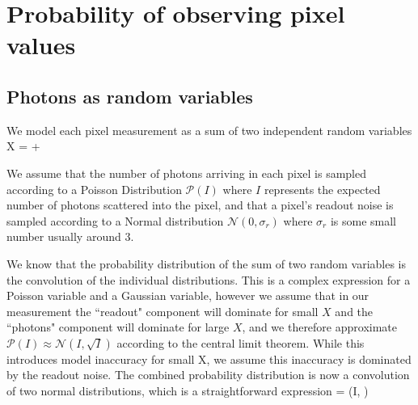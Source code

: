 \documentclass[dists.tex]{subfiles}
\begin{document}
\section{Probability of observing pixel values}

\subsection{Photons as random variables}
We model each pixel measurement as a sum of two independent random variables
\be
X =  + 
\ee

\noindent
We assume that the number of photons arriving in each pixel is sampled according to a Poisson Distribution $\mathcal{P}(I)$ where $I$ represents the expected number of photons scattered into the pixel, and that a pixel's readout noise is sampled according to a Normal distribution $\mathcal{N}(0, \sigma_r)$ where $\sigma_r$ is some small number usually around 3. 

\noindent We know that the probability distribution of the sum of two random variables is the convolution of the individual distributions. This is a complex expression for a Poisson variable and a Gaussian variable, however we assume that in our measurement the ``readout" component will dominate for small $X$ and the ``photons" component will dominate for large $X$, and we therefore approximate $\mathcal{P}(I) \approx \mathcal{N}(I, \sqrt{I}) $ according to the central limit theorem. While this introduces model inaccuracy for small X, we assume this inaccuracy is dominated by the readout noise. The combined probability distribution is now a convolution of two normal distributions, which is a straightforward expression
\be \label {sampleX}
 = (I, ) 
\ee

\begin{comment}
\noindent The Log-likelihood of multiple observations of X is then
\beq
&&\log \prod_\text{pixels}  \frac{1}{\sqrt{2\pi(I + \sigma_r^2)}} \exp \bigg(\frac{-(X-I)^2}{2(I + \sigma_r^2)}\bigg) \nonumber \\ 
 &=& C - \frac{1}{2}\sum_\text{pixels} \bigg( \log (I + \sigma_r^2)  + \frac{(X-I) ^2} { I + \sigma_r^2} \bigg)
\eeq

\noindent 
One sees here that the term $\sigma_r^2$ protects the likelihood expression from taking a log of a negative number, which can occur when the background model for $\lambda$ is poorly approximated for e.g. weak pixels values near 0. 
\end{comment}
\end{document}
